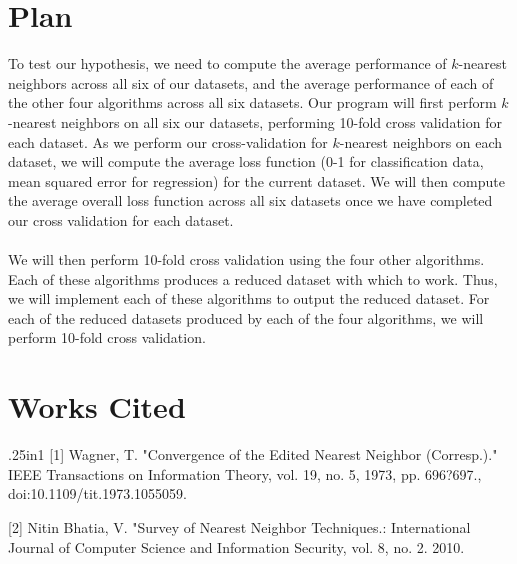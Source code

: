 \documentclass{article}
\begin{document}
\section{Plan}
To test our hypothesis, we need to compute the average performance of $k$-nearest neighbors across all six of our datasets, and the average performance of each of the other four algorithms across all six datasets. Our program will first perform $k$-nearest neighbors on all six our datasets, performing 10-fold cross validation for each dataset. As we perform our cross-validation for $k$-nearest neighbors on each dataset, we will compute the average loss function (0-1 for classification data, mean squared error for regression) for the current dataset. We will then compute the average overall loss function across all six datasets once we have completed our cross validation for each dataset. \\ \\
We will then perform 10-fold cross validation using the four other algorithms. Each of these algorithms produces a reduced dataset with which to work. Thus, we will implement each of these algorithms to output the reduced dataset. For each of the reduced datasets produced by each of the four algorithms, we will perform 10-fold cross validation.

\section{Works Cited}
\begin{hangparas}{.25in}{1}
[1] Wagner, T. "Convergence of the Edited Nearest Neighbor (Corresp.)." IEEE Transactions on Information Theory, vol. 19, no. 5, 1973, pp. 696?697., doi:10.1109/tit.1973.1055059.

[2] Nitin Bhatia, V. "Survey of Nearest Neighbor Techniques.: International Journal of Computer Science and Information Security, vol. 8, no. 2. 2010.
\end{hangparas}
\end{document}
